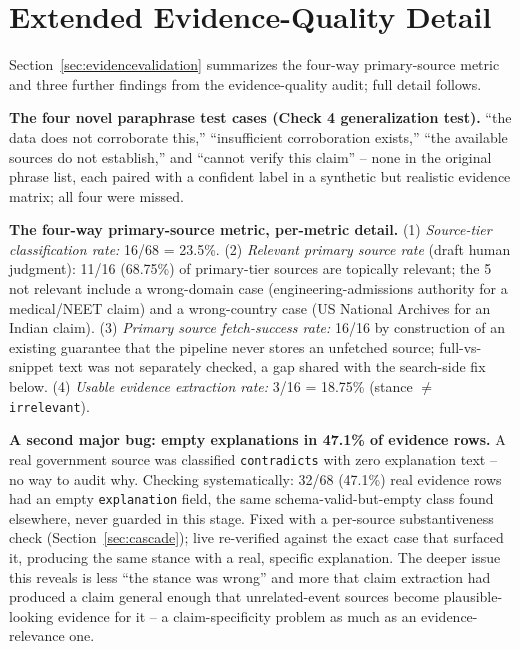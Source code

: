 \documentclass[conference]{IEEEtran}
\begin{document}
\section{Extended Evidence-Quality Detail}
\label{sec:appendixevidence}
Section~\ref{sec:evidencevalidation} summarizes the four-way
primary-source metric and three further findings from the
evidence-quality audit; full detail follows.

\textbf{The four novel paraphrase test cases (Check 4 generalization
test).} ``the data does not corroborate this,'' ``insufficient
corroboration exists,'' ``the available sources do not establish,'' and
``cannot verify this claim'' -- none in the original phrase list, each
paired with a confident label in a synthetic but realistic evidence
matrix; all four were missed.

\textbf{The four-way primary-source metric, per-metric detail.}
(1) \emph{Source-tier classification rate:} 16/68 = 23.5\%. (2)
\emph{Relevant primary source rate} (draft human judgment): 11/16
(68.75\%) of primary-tier sources are topically relevant; the 5 not
relevant include a wrong-domain case (engineering-admissions authority
for a medical/NEET claim) and a wrong-country case (US National Archives
for an Indian claim). (3) \emph{Primary source fetch-success rate:}
16/16 by construction of an existing guarantee that the pipeline never
stores an unfetched source; full-vs-snippet text was not separately
checked, a gap shared with the search-side fix below. (4) \emph{Usable
evidence extraction rate:} 3/16 = 18.75\% (stance $\neq$
\texttt{irrelevant}).

\textbf{A second major bug: empty explanations in 47.1\% of evidence
rows.} A real government source was classified \texttt{contradicts} with
zero explanation text -- no way to audit why. Checking systematically:
32/68 (47.1\%) real evidence rows had an empty \texttt{explanation}
field, the same schema-valid-but-empty class found elsewhere, never
guarded in this stage. Fixed with a per-source substantiveness check
(Section~\ref{sec:cascade}); live re-verified against the exact case that
surfaced it, producing the same stance with a real, specific explanation.
The deeper issue this reveals is less ``the stance was wrong'' and more
that claim extraction had produced a claim general enough that
unrelated-event sources become plausible-looking evidence for it -- a
claim-specificity problem as much as an evidence-relevance one.
\end{document}
